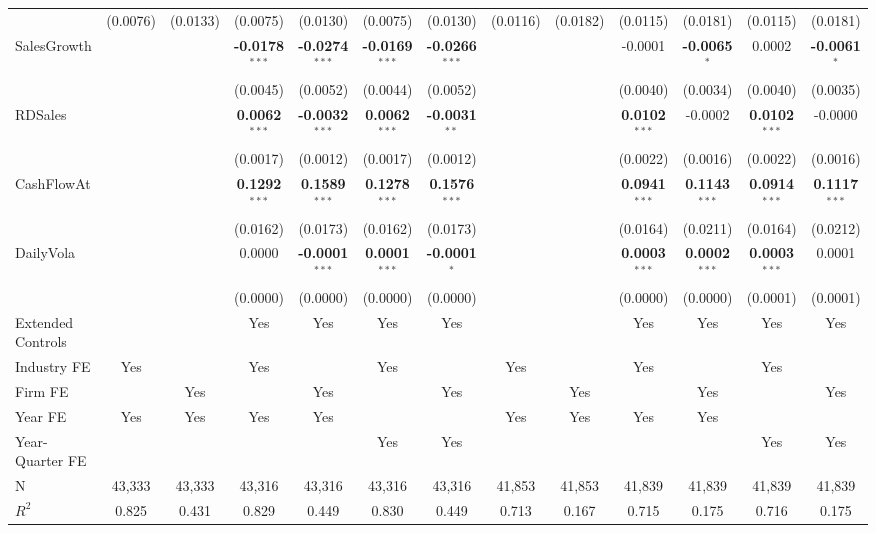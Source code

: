 \begin{landscape}
\begin{table}[H]
\begin{tabular}{lcccccccccccc}
 & (0.0076) & (0.0133) & (0.0075) & (0.0130) & (0.0075) & (0.0130) & (0.0116) & (0.0182) & (0.0115) & (0.0181) & (0.0115) & (0.0181) \\
SalesGrowth &  &  & \textbf{-0.0178}$^{***}$ & \textbf{-0.0274}$^{***}$ & \textbf{-0.0169}$^{***}$ & \textbf{-0.0266}$^{***}$ &  &  & -0.0001 & \textbf{-0.0065}$^{*}$ & 0.0002 & \textbf{-0.0061}$^{*}$ \\
 &  &  & (0.0045) & (0.0052) & (0.0044) & (0.0052) &  &  & (0.0040) & (0.0034) & (0.0040) & (0.0035) \\
RDSales &  &  & \textbf{0.0062}$^{***}$ & \textbf{-0.0032}$^{***}$ & \textbf{0.0062}$^{***}$ & \textbf{-0.0031}$^{**}$ &  &  & \textbf{0.0102}$^{***}$ & -0.0002 & \textbf{0.0102}$^{***}$ & -0.0000 \\
 &  &  & (0.0017) & (0.0012) & (0.0017) & (0.0012) &  &  & (0.0022) & (0.0016) & (0.0022) & (0.0016) \\
CashFlowAt &  &  & \textbf{0.1292}$^{***}$ & \textbf{0.1589}$^{***}$ & \textbf{0.1278}$^{***}$ & \textbf{0.1576}$^{***}$ &  &  & \textbf{0.0941}$^{***}$ & \textbf{0.1143}$^{***}$ & \textbf{0.0914}$^{***}$ & \textbf{0.1117}$^{***}$ \\
 &  &  & (0.0162) & (0.0173) & (0.0162) & (0.0173) &  &  & (0.0164) & (0.0211) & (0.0164) & (0.0212) \\
DailyVola &  &  & 0.0000 & \textbf{-0.0001}$^{***}$ & \textbf{0.0001}$^{***}$ & \textbf{-0.0001}$^{*}$ &  &  & \textbf{0.0003}$^{***}$ & \textbf{0.0002}$^{***}$ & \textbf{0.0003}$^{***}$ & 0.0001 \\
 &  &  & (0.0000) & (0.0000) & (0.0000) & (0.0000) &  &  & (0.0000) & (0.0000) & (0.0001) & (0.0001) \\
\midrule
Extended Controls &  &  & Yes & Yes & Yes & Yes &  &  & Yes & Yes & Yes & Yes \\
Industry FE & Yes &  & Yes &  & Yes &  & Yes &  & Yes &  & Yes &  \\
Firm FE &  & Yes &  & Yes &  & Yes &  & Yes &  & Yes &  & Yes \\
Year FE & Yes & Yes & Yes & Yes &  &  & Yes & Yes & Yes & Yes &  &  \\
Year-Quarter FE &  &  &  &  & Yes & Yes &  &  &  &  & Yes & Yes \\
\midrule
N & 43,333 & 43,333 & 43,316 & 43,316 & 43,316 & 43,316 & 41,853 & 41,853 & 41,839 & 41,839 & 41,839 & 41,839 \\
$R^2$ & 0.825 & 0.431 & 0.829 & 0.449 & 0.830 & 0.449 & 0.713 & 0.167 & 0.715 & 0.175 & 0.716 & 0.175 \\

\end{tabular}
\end{table}
\end{landscape}
